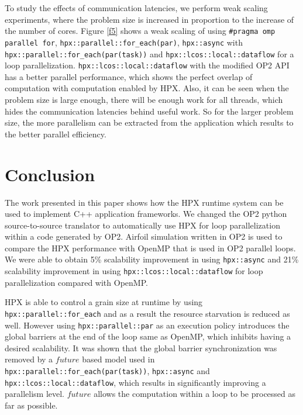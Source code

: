 \documentclass[conference]{IEEEtran}
\begin{document}
To study the effects of communication latencies, we perform weak scaling experiments, where the problem size is increased in proportion to the increase of the number of cores. Figure \ref{f5} shows a weak scaling of using \texttt{\#pragma omp parallel for}, \texttt{hpx::parallel::for\_each(par)}, \texttt{hpx::async} with \texttt{hpx::parallel::for\_each(par(task))} and \texttt{hpx::lcos::local::dataflow} for a loop parallelization. \texttt{hpx::lcos::local::dataflow} with the modified OP2 API has a better parallel performance, which shows the perfect overlap of computation with computation enabled by HPX. Also, it can be seen when the problem size is large enough, there will be enough work for all threads, which hides the communication latencies behind useful work. So for the larger problem size, the more parallelism can be extracted from the application which results to the better parallel efficiency. 





\section{Conclusion}
\label{sec:future}

The work presented in this paper shows how the HPX runtime system can be used to implement C++ application frameworks. We changed the OP2 python source-to-source translator to automatically use HPX for loop parallelization within a code generated by OP2. Airfoil simulation written in OP2 is used to compare the HPX performance with OpenMP that is used in OP2 parallel loops. We were able to obtain 5\% scalability improvement in using \texttt{hpx::async} and 21\% scalability improvement in using \texttt{hpx::lcos::local::dataflow} for loop parallelization compared with OpenMP.

HPX is able to control a grain size at runtime by using \texttt{hpx::parallel::for\_each} and as a result the resource starvation is reduced as well. However using \texttt{hpx::parallel::par} as an execution policy introduces the global barriers at the end of the loop same as OpenMP, which inhibits having a desired scalability. It was shown that the global barrier synchronization was removed by a $future$ based model used in \texttt{hpx::parallel::for\_each(par(task))}, \texttt{hpx::async} and \texttt{hpx::lcos::local::dataflow}, which results in significantly improving a parallelism level. $future$ allows the computation within a loop to be processed as far as possible. 
\end{document}
